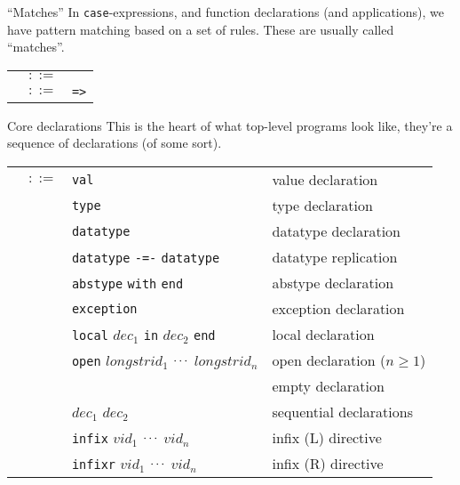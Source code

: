 \begin{grammar}{``Matches''}
In \texttt{case}-expressions, and function declarations (and
applications), we have pattern matching based on a set of rules. These
are usually called ``matches''.
\begin{longtable}{rcl}
\label{grammar:match}\nonterminal{match} & $::=$ & \nonterminal{mrule} \optional{\texttt{\char`\|} \nonterminal{match}} \\
\label{grammar:mrule}\nonterminal{mrule} & $::=$ & \hyperref[grammar:pat]{\nonterminal{pat}} \texttt{=>} \hyperref[grammar:exp]{\nonterminal{exp}}\\
\end{longtable}
\end{grammar}

\begin{grammar}{Core declarations}
This is the heart of what top-level programs look like, they're a
sequence of declarations (of some sort).
\begin{longtable}{rcll}
\label{grammar:dec}\nonterminal{dec} & $::=$ & \texttt{val}
\nonterminal{tyvarseq} \nonterminal{valbind} & value declaration\\
&\alt&\texttt{type} \nonterminal{typbind} & type declaration\\
&\alt&\texttt{datatype} \nonterminal{datbind} & datatype declaration\\
&\alt&\texttt{datatype} \nonterminal{tycon} \texttt{-=-} \texttt{datatype} \nonterminal{longtycon}
& datatype replication\\
&\alt&\texttt{abstype} \nonterminal{datbind} \texttt{with} \nonterminal{dec} \texttt{end} &
abstype declaration\\
&\alt&\texttt{exception} \nonterminal{exbind} & exception declaration\\
&\alt&\texttt{local} $dec_{1}$ \texttt{in} $dec_{2}$ \texttt{end} &
local declaration\\
&\alt&\texttt{open} $longstrid_{1}$ $\mathinner{{}^{\textstyle .\,.\,.}}$ $longstrid_{n}$ & open
declaration ($n\geq1$)\\
&\alt&&empty declaration\\
&\alt&$dec_{1}$ \optional{\texttt{;}} $dec_{2}$ & sequential declarations\\
&\alt&\texttt{infix} \optional{\textit{d}} $vid_{1}$ $\mathinner{{}^{\textstyle .\,.\,.}}$ $vid_{n}$
&infix (L) directive\\
&\alt&\texttt{infixr} \optional{\textit{d}} $vid_{1}$ $\mathinner{{}^{\textstyle .\,.\,.}}$ $vid_{n}$
&infix (R) directive\\

\end{longtable}
\end{grammar}
